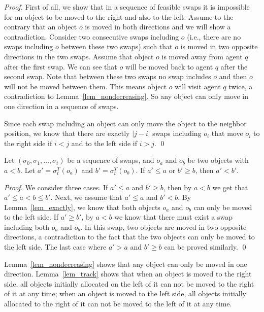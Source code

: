 \begin{proof}
    First of all, we show that in a sequence of feasible swaps
    it is impossible for an object to be moved to the right and also to the left.
    Assume to the contrary that an object $o$ is moved in both directions and we will show a contradiction.
    Consider two consecutive swaps including $o$ (i.e., there are no swaps including $o$ between these two swaps) such that $o$ is moved in two opposite directions in the two swaps.
    Assume that object $o$ is moved away from agent $q$ after the first swap. We can see that $o$ will be moved back to agent $q$ after the second swap. Note that between these two swaps no swap includes $o$ and then $o$ will not be moved between them.
    This means object $o$ will visit agent $q$ twice, a contradiction to Lemma~\ref{lem_nondecreasing}. So any object can only move in one direction in a sequence of swaps.

    Since each swap including an object can only move the object to the neighbor position, we know that
    there are exactly $|j-i|$ swaps including $o_i$ that move $o_i$ to the right side if $i<j$ and to the left side if $i>j$. \qed
\end{proof}


\begin{lemma}\label{lem_track}
Let $(\sigma _0,\sigma _1,\dots,\sigma _t)$ be a sequence of swaps,
 and $o_a$ and $o_b$
be two objects with $a<b$. Let $a'=\sigma^T_t(o_a)$ and $b'=\sigma^T_t(o_b)$.
If $a' \leq a$  or  $b' \geq b$, then $a'< b'$.
\end{lemma}
\begin{proof}
    We consider three cases.
    If $a' \leq a$  and  $b' \geq b$, then by $a<b$ we get that $a' \leq a<b \leq b'$.
    Next, we assume that $a' \leq a$  and  $b' < b$. By Lemma~\ref{lem_exactly}, we know that both objects $o_a$ and $o_b$ can only be moved to the left side.
    If $a' \geq b'$, by $a<b$ we know that there must exist a swap including both $o_a$ and $o_b$. In this swap, two objects are moved in two opposite directions, a contradiction to the fact that the two objects can only be moved to the left side.
    The last case where $a' > a$  and  $b' \geq b$ can be proved similarly. \qed
\end{proof}

Lemma~\ref{lem_nondecreasing} shows that any object can only be moved in one direction.
Lemma~\ref{lem_track} shows that when an object is moved to the right side, all objects initially allocated on the left of it can
not be moved to the right of it at any time; when an object is moved to the left side, all objects initially allocated to the right of it can
not be moved to the left of it at any time.

